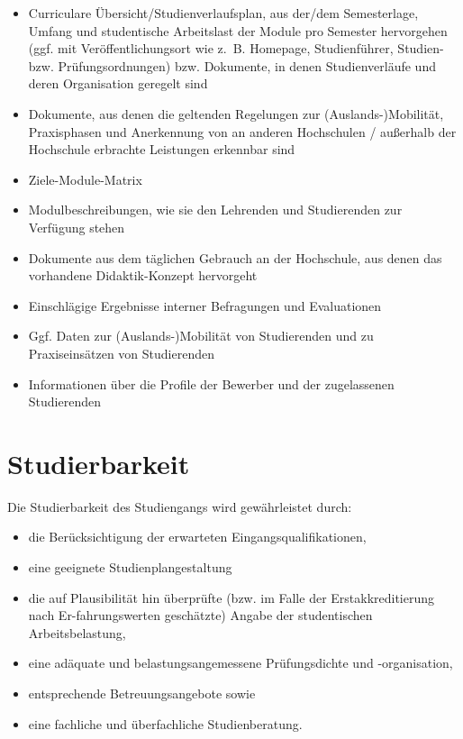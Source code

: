 \begin{itemize}
\item
  Curriculare Übersicht/Studienverlaufsplan, aus der/dem Semesterlage,
  Umfang und studentische Arbeitslast der Module pro Semester
  hervorgehen (ggf. mit Veröffentlichungsort wie z.~B. Homepage,
  Studienführer, Studien- bzw. Prüfungsordnungen) bzw. Dokumente, in
  denen Studienverläufe und deren Organisation geregelt sind
\item
  Dokumente, aus denen die geltenden Regelungen zur
  (Auslands-)Mobilität, Praxisphasen und Anerkennung von an anderen
  Hochschulen / außerhalb der Hochschule erbrachte Leistungen erkennbar
  sind
\item
  Ziele-Module-Matrix
\item
  Modulbeschreibungen, wie sie den Lehrenden und Studierenden zur
  Verfügung stehen
\item
  Dokumente aus dem täglichen Gebrauch an der Hochschule, aus denen das
  vorhandene Didaktik-Konzept hervorgeht
\item
  Einschlägige Ergebnisse interner Befragungen und Evaluationen
\item
  Ggf. Daten zur (Auslands-)Mobilität von Studierenden und zu
  Praxiseinsätzen von Studierenden
\item
  Informationen über die Profile der Bewerber und der zugelassenen
  Studierenden
\end{itemize}

%

\chapter{Studierbarkeit}\label{Studierbarkeit}


Die Studierbarkeit des Studiengangs wird gewährleistet durch:

\begin{itemize}
\item
  die Berücksichtigung der erwarteten Eingangsqualifikationen,
\item
  eine geeignete Studienplangestaltung
\item
  die auf Plausibilität hin überprüfte (bzw. im Falle der
  Erstakkreditierung nach Er-fahrungswerten geschätzte) Angabe der
  studentischen Arbeitsbelastung,
\item
  eine adäquate und belastungsangemessene Prüfungsdichte und
  -organisation,
\item
  entsprechende Betreuungsangebote sowie
\item
  eine fachliche und überfachliche Studienberatung.
\end{itemize}

